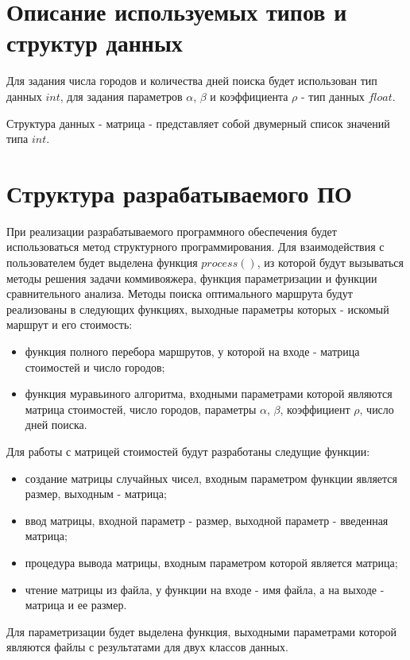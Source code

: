 \section{Описание используемых типов и структур данных}

Для задания числа городов и количества дней поиска будет использован тип данных $int$, для задания параметров $\alpha$, $\beta$ и коэффициента $\rho$ - тип данных $float$.

Структура данных - матрица - представляет собой двумерный список значений типа $int$.


\section{Структура разрабатываемого ПО}

При реализации разрабатываемого программного обеспечения будет использоваться метод структурного программирования. Для взаимодействия с пользователем будет выделена функция $process()$, из которой будут вызываться методы решения задачи коммивояжера, функция параметризации и функции сравнительного анализа. Методы поиска оптимального маршрута будут реализованы в следующих функциях, выходные параметры которых - искомый маршрут и его стоимость:
\begin{itemize}
	\item функция полного перебора маршрутов, у которой на входе - матрица стоимостей и число городов;
	\item функция муравьиного алгоритма, входными параметрами которой являются матрица стоимостей, число городов, параметры $\alpha$, $\beta$, коэффициент $\rho$, число дней поиска.
\end{itemize}

Для работы с матрицей стоимостей будут разработаны следущие функции:

\begin{itemize}
	\item создание матрицы случайных чисел, входным параметром функции является размер, выходным - матрица;
	\item ввод матрицы, входной параметр - размер, выходной параметр - введенная матрица;
	\item процедура вывода матрицы, входным параметром которой является матрица;
	\item чтение матрицы из файла, у функции на входе - имя файла, а на выходе - матрица и ее размер. 
\end{itemize}

Для параметризации будет выделена функция, выходными параметрами которой являются файлы с результатами для двух классов данных.

